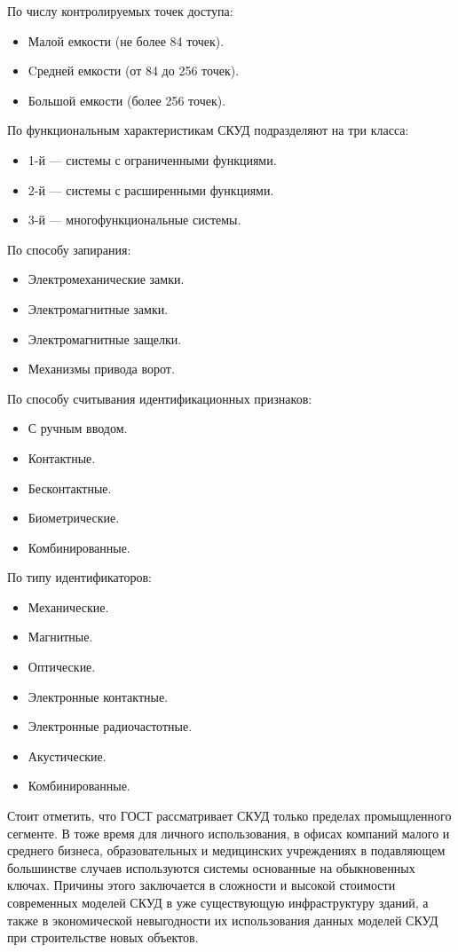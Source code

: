По числу контролируемых точек доступа:
\begin{itemize}
  \item Малой емкости (не более 84 точек).
  \item Cредней емкости (от 84 до 256 точек).
  \item Большой емкости (более 256 точек).
\end{itemize}

По функциональным характеристикам СКУД подразделяют на три класса:
\begin{itemize}
  \item 1-й — системы с ограниченными функциями.
  \item 2-й — системы с расширенными функциями.
  \item 3-й — многофункциональные системы.
\end{itemize}

По способу запирания:
\begin{itemize}
  \item Электромеханические замки.
  \item Электромагнитные замки.
  \item Электромагнитные защелки.
  \item Механизмы привода ворот.
\end{itemize} 

По способу считывания идентификационных признаков:
\begin{itemize}
  \item С ручным вводом.
  \item Контактные.
  \item Бесконтактные.
  \item Биометрические.
  \item Комбинированные.
\end{itemize} 

По типу идентификаторов:
\begin{itemize}
  \item Механические.
  \item Магнитные.
  \item Оптические.
  \item Электронные контактные.
  \item Электронные радиочастотные.
  \item Акустические.
  \item Комбинированные.
\end{itemize} 

Стоит отметить, что ГОСТ рассматривает СКУД только пределах промыщленного сегменте. В тоже время для личного использования, в офисах компаний малого и среднего бизнеса, образовательных и медицинских учреждениях в подавляющем большинстве случаев используются системы основанные на обыкновенных ключах. Причины этого заключается в сложности и высокой стоимости современных моделей СКУД в уже существующую инфраструктуру зданий, а также в экономической невыгодности их использования данных моделей СКУД при строительстве новых объектов. 

